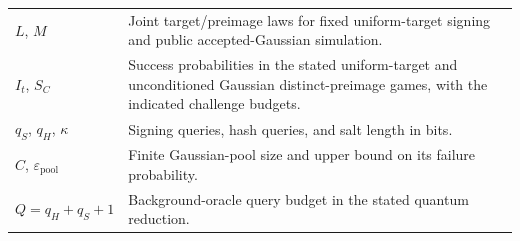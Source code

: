 \documentclass[11pt,a4paper]{article}
\newcommand{\eps}{\varepsilon}
\theoremstyle{definition}
\theoremstyle{remark}
\numberwithin{equation}{section}
\begin{document}
\begin{longtable}{@{}p{}p{}@{}}
$L$, $M$ & Joint target/preimage laws for fixed uniform-target signing and public accepted-Gaussian simulation. \\
$I_t$, $S_C$ & Success probabilities in the stated uniform-target and unconditioned Gaussian distinct-preimage games, with the indicated challenge budgets. \\
$q_S$, $q_H$, $\kappa$ & Signing queries, hash queries, and salt length in bits. \\
$C$, $\eps_{\mathrm{pool}}$ & Finite Gaussian-pool size and upper bound on its failure probability. \\
$Q=q_H+q_S+1$ & Background-oracle query budget in the stated quantum reduction. \\
\bottomrule
\end{longtable}
\end{document}

